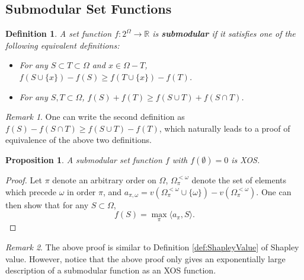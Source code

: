 \documentclass[openany]{book}
\newtheorem{definition}{Definition}[chapter]
\newtheorem{proposition}{Proposition}[chapter]
\theoremstyle{remark}
\newtheorem*{remark}{Remark}
\begin{document}
\subsection{Submodular Set Functions}
\begin{definition}
    A set function $f:2^{\Omega}\to \mathbb{R}$ is \textbf{submodular} if it satisfies one of the following equivalent definitions:
    \begin{itemize}
        \item For any $S\subset T\subset\Omega$ and $x\in\Omega-T$, $f(S\cup\{x\})-f(S)\ge f(T\cup\{x\})-f(T)$.
        \item For any $S,T\subset\Omega$, $f(S)+f(T)\ge f(S\cup T)+f(S\cap T)$.
    \end{itemize}
\end{definition}
\begin{remark}
    One can write the second definition as $f(S)-f(S\cap T)\ge f(S\cup T)-f(T)$, which naturally leads to a proof of equivalence of the above two definitions.
\end{remark}
\begin{proposition}
    A submodular set function $f$ with $f(\emptyset)=0$ is XOS.
\end{proposition}
\begin{proof}
    Let $\pi$ denote an arbitrary order on $\Omega$, $\Omega_{\pi}^{<\omega}$ denote the set of elements which precede $\omega$ in order $\pi$, and $a_{\pi,\omega}=v(\Omega_{\pi}^{<\omega}\cup\{\omega\})-v(\Omega_{\pi}^{<\omega})$. One can then show that for any $S\subset\Omega$,
    \begin{equation*}
        f(S)=\max_{\pi}\langle a_{\pi},S\rangle.
    \end{equation*}
\end{proof}
\begin{remark}
    The above proof is similar to Definition \ref{def:ShapleyValue} of Shapley value. However, notice that the above proof only gives an exponentially large description of a submodular function as an XOS function.
\end{remark}
\end{document}
